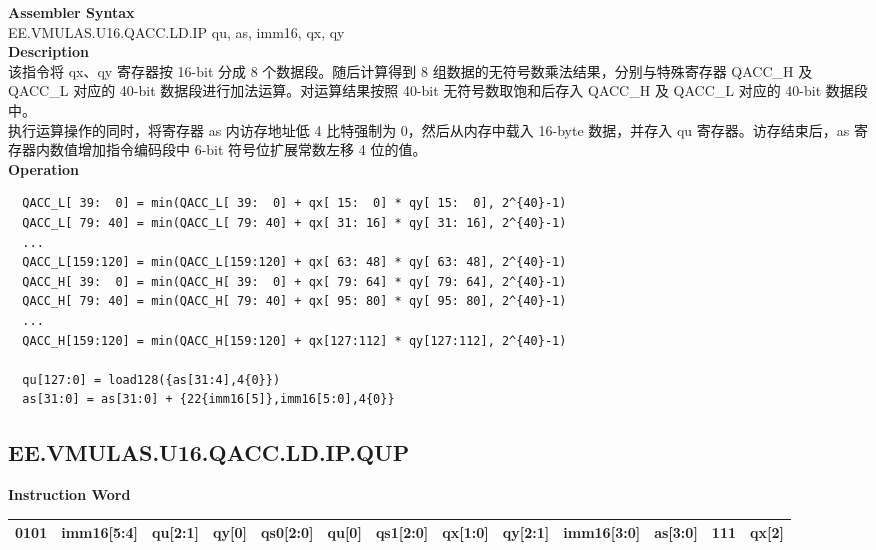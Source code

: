 \textbf{Assembler Syntax} \\
EE.VMULAS.U16.QACC.LD.IP qu, as, imm16, qx, qy \\
\textbf{Description} \\
该指令将 qx、qy 寄存器按 16-bit 分成 8 个数据段。随后计算得到 8 组数据的无符号数乘法结果，分别与特殊寄存器 QACC\_H 及 QACC\_L 对应的 40-bit 数据段进行加法运算。对运算结果按照 40-bit 无符号数取饱和后存入 QACC\_H 及 QACC\_L 对应的 40-bit 数据段中。\\
执行运算操作的同时，将寄存器 as 内访存地址低 4 比特强制为 0，然后从内存中载入 16-byte 数据，并存入 qu 寄存器。访存结束后，as 寄存器内数值增加指令编码段中 6-bit 符号位扩展常数左移 4 位的值。\\
\textbf{Operation}
\begin{lstlisting}
  QACC_L[ 39:  0] = min(QACC_L[ 39:  0] + qx[ 15:  0] * qy[ 15:  0], 2^{40}-1)
  QACC_L[ 79: 40] = min(QACC_L[ 79: 40] + qx[ 31: 16] * qy[ 31: 16], 2^{40}-1)
  ...
  QACC_L[159:120] = min(QACC_L[159:120] + qx[ 63: 48] * qy[ 63: 48], 2^{40}-1)
  QACC_H[ 39:  0] = min(QACC_H[ 39:  0] + qx[ 79: 64] * qy[ 79: 64], 2^{40}-1)
  QACC_H[ 79: 40] = min(QACC_H[ 79: 40] + qx[ 95: 80] * qy[ 95: 80], 2^{40}-1)
  ...
  QACC_H[159:120] = min(QACC_H[159:120] + qx[127:112] * qy[127:112], 2^{40}-1)

  qu[127:0] = load128({as[31:4],4{0}})
  as[31:0] = as[31:0] + {22{imm16[5]},imm16[5:0],4{0}}
\end{lstlisting}

\clearpage
\subsection{EE.VMULAS.U16.QACC.LD.IP.QUP}\label{instruction:EEVMULASU16QACCLDIPQUP}
\setlength\tabcolsep{5pt}
\textbf{Instruction Word} \\
\begin{tabular}{|c|c|c|c|c|c|c|c|c|c|c|c|c|}
	\hline
	0101 & imm16[5:4] & qu[2:1] & qy[0] & qs0[2:0] & qu[0] & qs1[2:0] & qx[1:0] & qy[2:1] & imm16[3:0] & as[3:0] & 111 & qx[2] \\
	\hline
\end{tabular}

